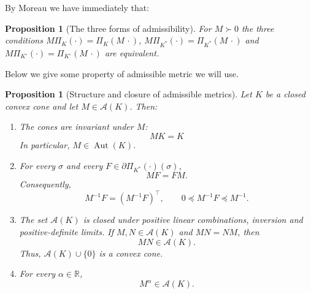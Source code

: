 \documentclass[a4paper,11pt]{book}
\theoremstyle{plain}
\newtheorem{proposition}[theorem]{Proposition}
\theoremstyle{definition}
\theoremstyle{remark}
\numberwithin{equation}{chapter}
\numberwithin{algorithm}{chapter}
\newcommand{\proj}[2]{\Pi_{#2}\!\left(#1\right)}
\begin{document}
	
	By Moreau we have immediately that:
	\begin{proposition}[The three forms of admissibility]
		For $M\succ0$ the three conditions
		$M\proj{\cdot}{K}=\proj{M\,\cdot}{K}$,
		$M\proj{\cdot}{K^*}=\proj{M\,\cdot}{K^*}$ and
		$M\proj{\cdot}{K^\circ}=\proj{M\,\cdot}{K^\circ}$ are equivalent.
	\end{proposition}
	
	Below we give some property of admissible metric we will use.
	\begin{proposition}[Structure and closure of admissible metrics]
		Let $K$ be a closed convex cone and let $M\in\mathcal A(K)$. Then:
		
		\begin{enumerate}
			\item The cones are invariant under $M$:
			\[
			MK=K
			\]
			In particular, $M\in\operatorname{Aut}(K)$.
			
			\item For every $\sigma$ and every
			$F\in\partial\proj{\cdot}{K^*}(\sigma)$,
			\[
			MF=FM.
			\]
			Consequently,
			\[
			M^{-1}F=(M^{-1}F)^\top,
			\qquad
			0\preceq M^{-1}F\preceq M^{-1}.
			\]
			
			\item The set $\mathcal A(K)$ is closed under positive linear combinations,
			inversion and positive-definite limits. If $M,N\in\mathcal A(K)$ and $MN=NM$,
			then
			\[
			MN\in\mathcal A(K).
			\]
			Thus, $\mathcal A(K)\cup\{0\}$ is a convex cone.
			
			\item For every $\alpha\in\mathbb R$,
			\[
			M^\alpha\in\mathcal A(K).
			\]
			
		\end{enumerate}
	\end{proposition}
	
\end{document}
